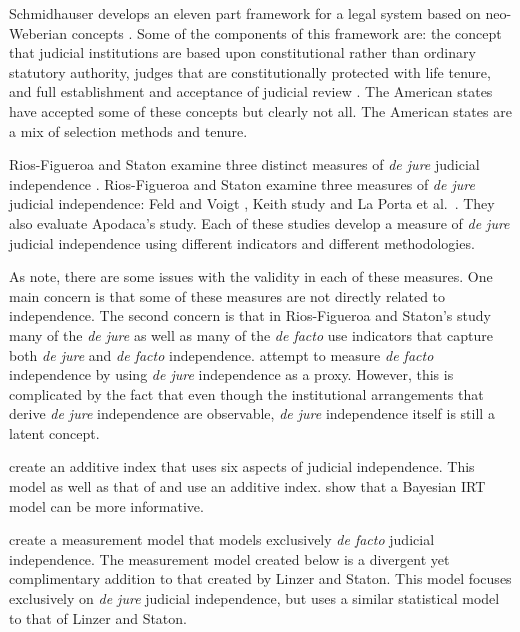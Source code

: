 \documentclass[12pt]{article}
\begin{document}
Schmidhauser develops an eleven part framework for a legal system based on neo-Weberian concepts \citep{Schmidhauser1987}.  Some of the components of this framework are: the concept that judicial institutions are based upon constitutional rather than ordinary statutory authority,  judges that are constitutionally protected with life tenure, and full establishment and acceptance of judicial review \cite[46-47]{Schmidhauser1987}.  The American states have accepted some of these concepts but clearly not all.  The American states are a mix of selection methods and tenure.

Rios-Figueroa and Staton examine three distinct measures of \textit{de jure} judicial independence \citep{Rios2014}.  Rios-Figueroa and Staton examine three measures of \textit{de jure} judicial independence: Feld and Voigt \citeyearpar{Feld2003}, Keith \citeyearpar{Keith2002a} study and La Porta et al.\ \citeyearpar{Laporta2004}.  They also evaluate Apodaca's \citeyearpar{Apodaca2004} study.  Each of these studies develop a measure of \textit{de jure} judicial independence using different indicators and different methodologies.

As \citet{Rios2014} note, there are some issues with the validity in each of these measures.  One main concern is that some of these measures are not directly related to independence.  The second concern is that in Rios-Figueroa and Staton's study many of the \textit{de jure} as well as many of the \textit{de facto} use indicators that capture both \textit{de jure} and \textit{de facto} independence.  \citet*{Laporta2004} attempt to measure \textit{de facto} independence by using \textit{de jure} independence as a proxy.  However, this is complicated by the fact that even though the institutional arrangements that derive \textit{de jure} independence are observable, \textit{de jure} independence itself is still a latent concept. 

\citet*{Melton2014} create an additive index that uses six aspects of judicial independence.  This model as well as that of \citet*{Voigt2007} and \citet*{Keith2002b} use an additive index.  \citet*{Linzer2014} show that a Bayesian IRT model can be more informative.

\citet*{Linzer2014} create a measurement model that models exclusively \textit{de facto} judicial independence.  The measurement model created below is a divergent yet complimentary addition to that created by Linzer and Staton.  This model focuses exclusively on \textit{de jure} judicial independence, but uses a similar statistical model to that of Linzer and Staton.  
\end{document}
